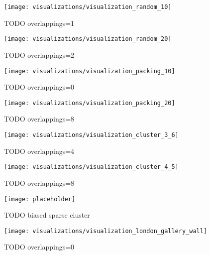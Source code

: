\begin{figure}[h!]
    \texttt{[image: visualizations/visualization\_random\_10]}
    \caption
    {TODO overlappings=1}
    \label{fig:results:visualization-random-10}
\end{figure}

\begin{figure}[h!]
    \texttt{[image: visualizations/visualization\_random\_20]}
    \caption
    {TODO overlappings=2}
    \label{fig:results:visualization-random-20}
\end{figure}

\begin{figure}[h!]
    \texttt{[image: visualizations/visualization\_packing\_10]}
    \caption
    {TODO overlappings=0}
    \label{fig:results:visualization-packing-10}
\end{figure}

\begin{figure}[h!]
    \texttt{[image: visualizations/visualization\_packing\_20]}
    \caption
    {TODO overlappings=8}
    \label{fig:results:visualization-packing-20}
\end{figure}

\begin{figure}[h!]
    \texttt{[image: visualizations/visualization\_cluster\_3\_6]}
    \caption
    {TODO overlappings=4}
    \label{fig:results:visualization-cluster-3-6}
\end{figure}

\begin{figure}[h!]
    \texttt{[image: visualizations/visualization\_cluster\_4\_5]}
    \caption
    {TODO overlappings=8}
    \label{fig:results:visualization-cluster-4-5}
\end{figure}

\begin{figure}[h!]
    \texttt{[image: placeholder]}
    \caption
    {TODO biased sparse cluster}
    \label{fig:results:visualization-biased-sparse-cluster}
\end{figure}


\begin{figure}[h!]
    \texttt{[image: visualizations/visualization\_london\_gallery\_wall]}
    \caption
    {TODO overlappings=0}
    \label{fig:results:visualization-london-gallery-wall}
\end{figure}


